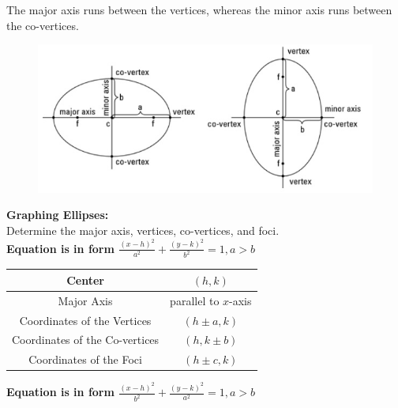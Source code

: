         \noindent The major axis runs between the vertices, whereas the minor axis runs between
        the co-vertices. \\

        \begin{figure} [hbt!]
            \centering
            \includegraphics [scale=0.6] {Resources/Unit10Conics/ellipse1.jpg}
        \end{figure}

        \noindent \color{purple} \textbf{Graphing Ellipses:} \color{black} \\
        Determine the major axis, vertices, co-vertices, and foci. \\
        \textbf{Equation is in form $\frac{(x-h)^2}{a^2}+\frac{(y-k)^2}{b^2}=1, a>b$}

        \begin{center}
            \begin{tabular} {|c|c|}
                \hline
                Center                         & $(h,k)$              \\
                \hline
                Major Axis                     & parallel to $x$-axis \\
                \hline
                Coordinates of the Vertices    & $(h\pm a, k)$        \\
                \hline
                Coordinates of the Co-vertices & $(h,k \pm b)$        \\
                \hline
                Coordinates of the Foci        & $(h\pm c, k)$        \\
                \hline
            \end{tabular}
        \end{center}

        \noindent \textbf{Equation is in form $\frac{(x-h)^2}{b^2}+\frac{(y-k)^2}{a^2}=1, a>b$} \\

